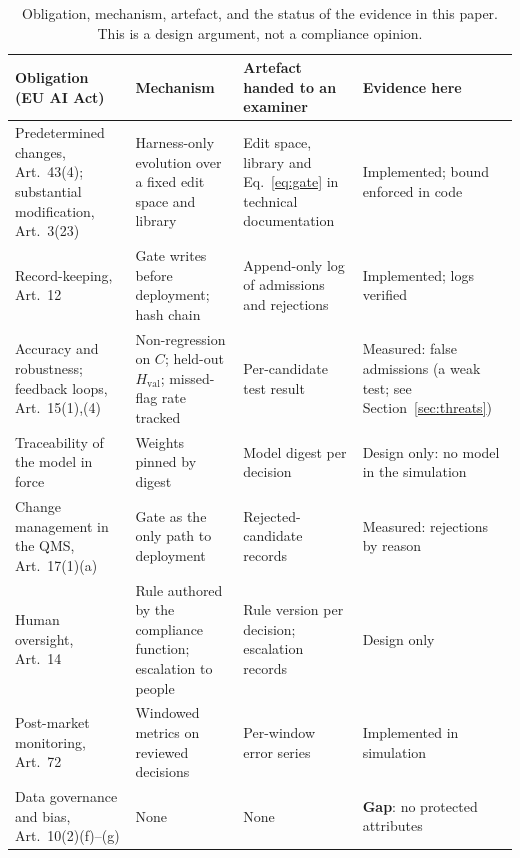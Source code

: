 \documentclass[11pt]{article}
\newcommand{\Hval}{H_{\mathrm{val}}}
\begin{document}
\begin{table}[t]
\centering\small
\caption{Obligation, mechanism, artefact, and the status of the evidence in this paper. This is a design argument, not a compliance opinion.}
\label{tab:reg}
\begin{tabularx}{\linewidth}{>{\raggedright}p{2.6cm}>{\raggedright}X>{\raggedright}X>{\raggedright\arraybackslash}p{2.6cm}}
\toprule
Obligation (EU AI Act) & Mechanism & Artefact handed to an examiner & Evidence here\\
\midrule
Predetermined changes, Art.~43(4); substantial modification, Art.~3(23) & Harness-only evolution over a fixed edit space and library & Edit space, library and Eq.~\eqref{eq:gate} in technical documentation & Implemented; bound enforced in code\\
Record-keeping, Art.~12 & Gate writes before deployment; hash chain & Append-only log of admissions and rejections & Implemented; \ncells{} logs verified\\
Accuracy and robustness; feedback loops, Art.~15(1),(4) & Non-regression on $C$; held-out $\Hval$; missed-flag rate tracked & Per-candidate test result & Measured: \gfadual{} false admissions (a weak test; see Section~\ref{sec:threats})\\
Traceability of the model in force & Weights pinned by digest & Model digest per decision & Design only: no model in the simulation\\
Change management in the QMS, Art.~17(1)(a) & Gate as the only path to deployment & Rejected-candidate records & Measured: rejections by reason\\
Human oversight, Art.~14 & Rule authored by the compliance function; escalation to people & Rule version per decision; escalation records & Design only\\
Post-market monitoring, Art.~72 & Windowed metrics on reviewed decisions & Per-window error series & Implemented in simulation\\
Data governance and bias, Art.~10(2)(f)--(g) & None & None & \textbf{Gap}: no protected attributes\\
\bottomrule
\end{tabularx}
\end{table}
\end{document}
